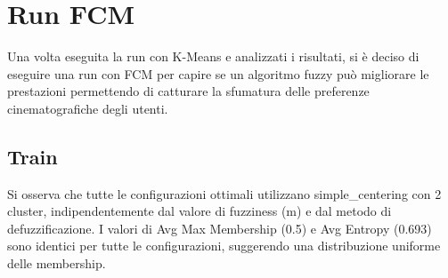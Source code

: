 \section{Run FCM}

Una volta eseguita la run con K-Means e analizzati i risultati, si è deciso di eseguire una run con FCM per capire se un algoritmo fuzzy può migliorare le prestazioni permettendo di catturare la sfumatura delle preferenze cinematografiche degli utenti.

\subsection{Train}

\begin{table}[H]
  \centering
  \caption{Top 5 Configurazioni per Train RMSE - Run FCM}
\end{table}

Si osserva che tutte le configurazioni ottimali utilizzano simple\_centering con 2 cluster, indipendentemente dal valore di fuzziness (m) e dal metodo di defuzzificazione. I valori di Avg Max Membership (0.5) e Avg Entropy (0.693) sono identici per tutte le configurazioni, suggerendo una distribuzione uniforme delle membership.

